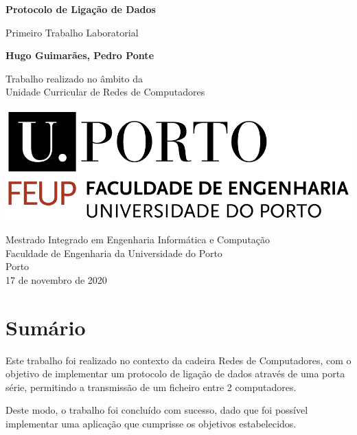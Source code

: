 \documentclass[11pt]{article}
\begin{document}
\begin{titlepage}
	\begin{center}
		\vspace*{1cm}
		
		\Large
		\textbf{Protocolo de Ligação de Dados}
		
		\vspace{0.5cm}
		\large
		Primeiro Trabalho Laboratorial
		
		\vspace{1.5cm}
		
		\textbf{Hugo Guimarães, Pedro Ponte}
		
		\vspace{7cm}
		
		Trabalho realizado no âmbito da\\
		Unidade Curricular de Redes de Computadores
		
		\vspace{0.8cm}
		
		\includegraphics[width=0.4 \textwidth]{feup_logo.png}
		
		\vspace{1.5cm}		
		
		\large
		Mestrado Integrado em Engenharia Informática e Computação\\
		Faculdade de Engenharia da Universidade do Porto\\
		Porto\\
		17 de novembro de 2020
	
	\end{center}
\end{titlepage}


\pagebreak
\tableofcontents

\pagebreak

\section*{Sumário}

Este trabalho foi realizado no contexto da cadeira Redes de Computadores, com o objetivo de implementar um protocolo de  ligação de dados através de uma porta série, permitindo a transmissão de um ficheiro entre 2 computadores.
 
Deste modo, o trabalho foi concluído com sucesso, dado que foi possível implementar uma aplicação que cumprisse os objetivos estabelecidos.
\end{document}
